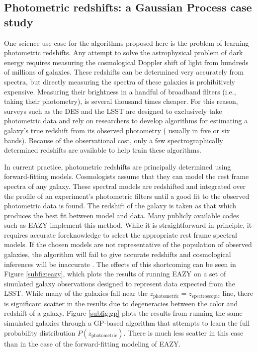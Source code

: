 \documentclass[prd,nofootbib,floatfix,11pt,tightenlines]{revtex4}
\begin{document}
\subsection{Photometric redshifts: a Gaussian Process case study}
\label{sec:photoz}

One science use case for the algorithms proposed here is the problem of
learning photometric redshifts.  Any attempt to solve the astrophysical
problem of dark energy requires measuring the cosmological Doppler shift of
light from hundreds of millions of galaxies.  These redshifts can be
determined very accurately from spectra, but directly measuring the spectra
of these galaxies is prohibitively expensive.  Measuring their brightness
in a handful of broadband filters (i.e., taking their photometry), is
several thousand times cheaper.  For this reason, surveys such as the DES
and the LSST are designed to exclusively take photometric data and rely on
researchers to develop algorithms for estimating a galaxy's true redshift
from its observed photometry (\citet{connolly95} usually in five or six bands).  Because of
the observational cost, only a few spectrographically determined redshifts are available
to help train these algorithms.

In current practice, photometric redshifts are principally determined using
forward-fitting models.  Cosmologists assume that they can model the rest frame
spectra of any galaxy.  These spectral models are
redshifted and integrated over the profile of an experiment's
photometric filters until a good fit to the observed photometric data is
found.  The redshift of the galaxy is taken as that which produces the best fit
between model and data.  Many publicly available codes such as 
EAZY \cite{eazy} implement this method.  
While it is straightforward in principle, it requires
accurate foreknowledge to select the appropriate rest frame 
spectral models.  If the chosen
models are not representative of the population of observed
galaxies, the algorithm will fail to give accurate redshifts and cosmological
inferences will be inaccurate \cite{budavari2008}.  The effects of this
shortcoming can be seen in Figure \ref{subfig:eazy}, which plots the results
of running EAZY on a set of
simulated galaxy observations designed to represent data expected from the
LSST.
While many of the galaxies fall near the
$z_\text{photometric}=z_\text{spectroscopic}$ line, there is significant scatter
in the results due to degeneracies between the color and redshift of a
galaxy.  Figure \ref{subfig:gp} plots the results from running the same
simulated galaxies through a GP-based algorithm that attempts to learn the full
probability distribution $P(z_\text{photometric})$.  There is much less scatter
in this case than in the case of the forward-fitting modeling of EAZY.
\end{document}

